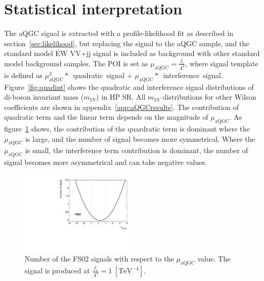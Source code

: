 \section{Statistical interpretation}
The aQGC signal is extracted with a profile-likelihood fit as described in section~\ref{sec:likelihood}, but replacing the signal to the aQGC sample, and the standard model EW VV+jj signal is included as background with other standard model background samples.
The POI is set as $\mu_{\mathrm{aQGC}} = \frac{f_i}{\Lambda^4}$, where signal template is defined as $\mu_{\mathrm{aQGC}}^2*$~quadratic~signal $+$ $\mu_{\mathrm{aQGC}}*$~interference~signal.
Figure~\ref{fig:quadint} shows the quadratic and interference signal distributions of di-boson invariant mass ($m_{VV}$) in HP SR.
All $m_{VV}$ distributions for other Wilson coefficients are shown in appendix~\ref{app:aQGCresults}.  
The contribution of quadratic term and the linear term depends on the magnitude of $\mu_\mathrm{aQGC}$.
As figure~\ref{fig:largemu} shows, the contribution of the quardratic term is dominant where the $\mu_\mathrm{aQGC}$ is large, and the number of signal becomes more symmetrical. Where the $\mu_\mathrm{aQGC}$ is small, the interference term contribution is dominant, the number of signal becomes more asymmetrical and can take negative values.
\begin{figure}[ht]
    \centering
        \includegraphics[width=0.50\textwidth]{figures/aQGC/largemu.pdf}
        \caption{Number of the FS02 signals with respect to the $\mu_\mathrm{aQGC}$ value. The signal is produced at $\frac{f_i}{\Lambda^4} = 1~[\mathrm{TeV}^{-4}]$. }
        \label{fig:largemu}
\end{figure}
